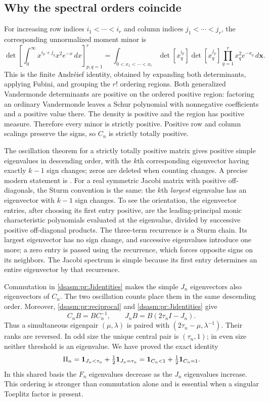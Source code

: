 \documentclass[11pt,letterpaper]{article}
\theoremstyle{remark}\newtheorem{remark}[theorem]{Remark}
\begin{document}
\subsection{Why the spectral orders coincide}
For increasing row indices $i_1<\cdots<i_r$ and column indices
$j_1<\cdots<j_r$, the corresponding unnormalized moment minor is
\begin{equation}\label{dsasm:pr:andreief}
 \det\left[\int_0^\infty x^{i_p+j_q}x^2e^{-x}\,dx\right]_{p,q=1}^r
 =\int_{0<x_1<\cdots<x_r}
 \det[x_q^{i_p}]\det[x_q^{j_p}]\prod_{q=1}^r x_q^2e^{-x_q}\,d\mathbf x.
\end{equation}
This is the finite Andr\'eief identity, obtained by expanding both
determinants, applying Fubini, and grouping the $r!$ ordering regions.
Both generalized Vandermonde determinants are positive on the ordered
positive region: factoring an ordinary Vandermonde leaves a Schur
polynomial with nonnegative coefficients and a positive value there.
The density is positive and the region has positive measure. Therefore
every minor is strictly positive. Positive row and column scalings
preserve the signs, so $C_n$ is strictly totally positive.

The oscillation theorem for a strictly totally positive matrix gives
positive simple eigenvalues in descending order, with the $k$th
corresponding eigenvector having exactly $k-1$ sign changes; zeros
are deleted when counting changes. A precise modern statement is
\cite[Section 3.3 and Theorem 2]{amg}. For a real symmetric Jacobi
matrix with positive off-diagonals, the Sturm convention is the same:
the $k$th \emph{largest} eigenvalue has an eigenvector with $k-1$
sign changes. To see the orientation, the eigenvector entries, after
choosing its first entry positive, are the leading-principal monic
characteristic polynomials evaluated at the eigenvalue, divided by
successive positive off-diagonal products. The three-term recurrence
is a Sturm chain. Its largest eigenvector has no sign change, and
successive eigenvalues introduce one more; a zero entry is passed
using the recurrence, which forces opposite signs on its neighbors.
The Jacobi spectrum is simple because its first entry determines an
entire eigenvector by that recurrence.

Commutation in \eqref{dsasm:pr:Jidentities} makes the simple $J_n$ eigenvectors
also eigenvectors of $C_n$. The two oscillation counts place them in
the same descending order. Moreover, \eqref{dsasm:pr:reciprocal} and
\eqref{dsasm:pr:Jidentities} give
\[
 C_nB=BC_n^{-1},\qquad J_nB=B(2\tau_nI-J_n).
\]
Thus a simultaneous eigenpair $(\mu,\lambda)$ is paired with
$(2\tau_n-\mu,\lambda^{-1})$. Their ranks are reversed. In odd
size the unique central pair is $(\tau_n,1)$; in even size neither
threshold is an eigenvalue. We have proved the exact identity
\begin{equation}\label{dsasm:pr:projector}
 \Pi_n=\mathbf1_{J_n<\tau_n}+\tfrac12\mathbf1_{J_n=\tau_n}
      =\mathbf1_{C_n<1}+\tfrac12\mathbf1_{C_n=1}.
\end{equation}
In this shared basis the $F_n$ eigenvalues decrease as the $J_n$
eigenvalues increase. This ordering is stronger than commutation
alone and is essential when a singular Toeplitz factor is present.
\end{document}
